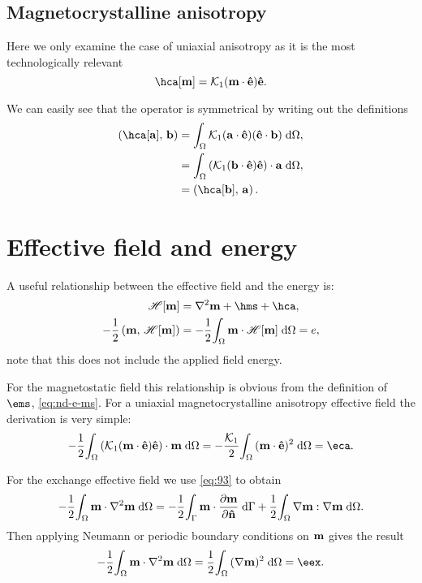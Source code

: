 \subsection{Magnetocrystalline anisotropy}

Here we only examine the case of uniaxial anisotropy as it is the most technologically relevant
\begin{equation}
  \hca[\mv] = \kone (\mv \cdot \ev) \ev.
\end{equation}

We can easily see that the operator is symmetrical by writing out the definitions
\begin{equation}
  \begin{aligned}
    \ip{\hca[\av]}{\bv} &= \intd{ \kone (\av \cdot \ev) (\ev \cdot \bv)}, \\
    &= \intd{(\kone(\bv \cdot \ev) \ev) \cdot \av}, \\
    &= \ip{\hca[\bv]}{\av}.
  \end{aligned}
\end{equation}


\section{Effective field and energy}
\label{sec:energy-field-relation}

A useful relationship between the effective field and the energy is:
\begin{equation}
  \begin{aligned}
    \hop[\mv] &=  \lap \mv + \hms + \hca, \\
    -\frac{1}{2} \ip{\mv}{\hop[\mv]} &= - \frac{1}{2} \intd{\mv \cdot
      \hop[\mv]} = \e,
  \end{aligned}
\end{equation}
note that this does not include the applied field energy.

For the magnetostatic field this relationship is obvious from the definition of $\ems$, \cref{eq:nd-e-ms}.
For a uniaxial magnetocrystalline anisotropy effective field the derivation is very simple:
\begin{equation}
  - \frac{1}{2} \intd{\bigb{\kone (\mv \cdot \ev) \ev} \cdot \mv} =  - \frac{\kone}{2}\intd{(\mv \cdot \ev)^2} = \eca.
\end{equation}

For the exchange effective field we use \cref{eq:93} to obtain
\begin{equation}
  -\frac{1}{2} {\int_{\Omega} {\boldsymbol{\mathrm{m}} \cdot \nabla^2  \boldsymbol{\mathrm{m}}} {\; \mathrm{{d}}} {\Omega}} = -\frac{1}{2} {\int_{{\Gamma}} {\boldsymbol{\mathrm{m}} \cdot \frac{\partial \boldsymbol{\mathrm{m}}}{\partial \boldsymbol{\mathrm{\hat{n}}}}} {\; \mathrm{{d}}} {{\Gamma}}} + \frac{1}{2}  {\int_{\Omega} {\nabla \boldsymbol{\mathrm{m}} : \nabla \boldsymbol{\mathrm{m}}} {\; \mathrm{{d}}} {\Omega}}.
\end{equation}
Then applying Neumann or periodic boundary conditions on $\boldsymbol{\mathrm{m}}$ gives the result
\begin{equation}
  -\frac{1}{2} \intd{\mv \cdot \lap \mv} = \frac{1}{2} \intd{(\grad \mv)^2} = \eex.
\end{equation}



